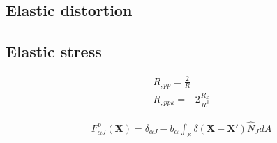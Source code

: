 \documentclass[10pt]{report}
\begin{document}
{%
\subsection{Elastic distortion}

\subsection{Elastic stress}

\begin{align}
R_{,pp}=\frac{2}{R}\\
R_{,ppk}=-2\frac{R_k}{R^3}
\end{align}





\begin{align}
F^p_{\alpha J}(\bm X)=\delta_{\alpha J}-b_\alpha\int_\mathcal{S}\delta(\bm X-\bm X')\hat{N}_JdA
\end{align}




}
\end{document}
